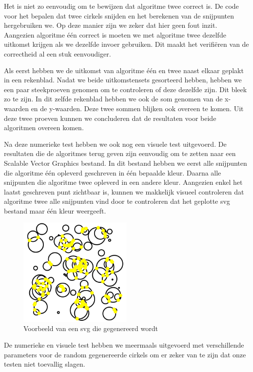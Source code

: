 \documentclass[11pt,a4paper]{article}
\begin{document}
Het is niet zo eenvoudig om te bewijzen dat algoritme twee correct is. De code voor het bepalen dat twee cirkels snijden en het berekenen van de snijpunten hergebruiken we. Op deze manier zijn we zeker dat hier geen fout inzit.
Aangezien algoritme \'e\'en correct is moeten we met algoritme twee dezelfde uitkomst krijgen als we dezelfde invoer gebruiken. Dit maakt het verifi\"eren van de correctheid al een stuk eenvoudiger.

Als eerst hebben we de uitkomst van algoritme \'e\'en en twee naast elkaar geplakt in een rekenblad. Nadat we beide uitkomstensets gesorteerd hebben, hebben we een paar steekproeven genomen om te controleren of deze dezelfde zijn. Dit bleek zo te zijn. In dit zelfde rekenblad hebben we ook de som genomen van de x-waarden en de y-waarden. Deze twee sommen blijken ook overeen te komen. Uit deze twee proeven kunnen we concluderen dat de resultaten voor beide algoritmen overeen komen.

Na deze numerieke test hebben we ook nog een visuele test uitgevoerd. De resultaten die de algoritmes terug geven zijn eenvoudig om te zetten naar een Scalable Vector Graphics bestand. In dit bestand hebben we eerst alle snijpunten die algoritme \'e\'en opleverd geschreven in \'e\'en bepaalde kleur. Daarna alle snijpunten die algoritme twee opleverd in een andere kleur. Aangezien enkel het laatst geschreven punt zichtbaar is, kunnen we makkelijk visueel controleren dat algoritme twee alle snijpunten vind door te controleren dat het geplotte svg bestand maar \'e\'en kleur weergeeft.

\begin{figure}[H]
\centering
\includegraphics[width=0.5\textwidth]{vb_svg.png}
\caption*{Voorbeeld van een svg die gegenereerd wordt}
\end{figure}

De numerieke en visuele test hebben we meermaals uitgevoerd met verschillende parameters voor de random gegenereerde cirkels om er zeker van te zijn dat onze testen niet toevallig slagen.
\end{document}
